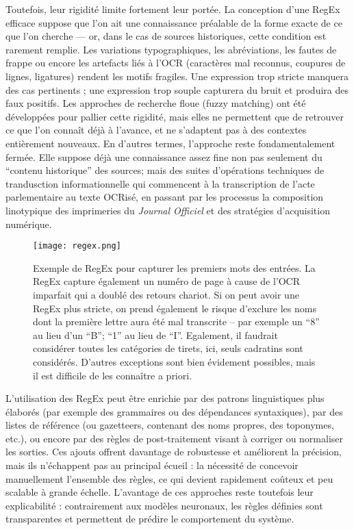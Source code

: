 Toutefois, leur rigidité limite fortement leur portée. La conception d’une RegEx efficace suppose que l’on ait une connaissance préalable de la forme exacte de ce que l’on cherche — or, dans le cas de sources historiques, cette condition est rarement remplie. Les variations typographiques, les abréviations, les fautes de frappe ou encore les artefacts liés à l’OCR (caractères mal reconnus, coupures de lignes, ligatures) rendent les motifs fragiles. Une expression trop stricte manquera des cas pertinents ; une expression trop souple capturera du bruit et produira des faux positifs. Les approches de recherche floue (fuzzy matching) ont été développées pour pallier cette rigidité, mais elles ne permettent que de retrouver ce que l’on connaît déjà à l’avance, et ne s’adaptent pas à des contextes entièrement nouveaux. En d’autres termes, l’approche reste fondamentalement fermée. Elle suppose déjà une connaissance assez fine non pas seulement du \enquote{contenu historique} des sources; mais des suites d'opérations techniques de trandusction informationnelle qui commencent à la transcription de l'acte parlementaire au texte OCRisé, en passant par les processus la composition linotypique des imprimeries du \emph{Journal Officiel} et des stratégies d'acquisition numérique.

\begin{figure}[htbp]
\centering
\texttt{[image: regex.png]}
\caption{Exemple de RegEx pour capturer les premiers mots des entrées. La RegEx capture également un numéro de page à cause de l'OCR imparfait qui a doublé des retours chariot. Si on peut avoir une RegEx plus stricte, on prend également le risque d'exclure les noms dont la première lettre aura été mal transcrite -- par exemple un \enquote{8} au lieu d'un \enquote{B}; \enquote{1} au lieu de \enquote{I}. Egalement, il faudrait considérer toutes les catégories de tirets, ici, seuls cadratins sont considérés. D'autres exceptions sont bien évidement possibles, mais il est difficile de les connaître a priori.}
\label{fig:regex}
\end{figure}

L’utilisation des RegEx peut être enrichie par des patrons linguistiques plus élaborés (par exemple des grammaires ou des dépendances syntaxiques), par des listes de référence (ou gazetteers, contenant des noms propres, des toponymes, etc.), ou encore par des règles de post-traitement visant à corriger ou normaliser les sorties. Ces ajouts offrent davantage de robustesse et améliorent la précision, mais ils n’échappent pas au principal écueil : la nécessité de concevoir manuellement l’ensemble des règles, ce qui devient rapidement coûteux et peu scalable à grande échelle. L’avantage de ces approches reste toutefois leur explicabilité : contrairement aux modèles neuronaux, les règles définies sont transparentes et permettent de prédire le comportement du système.


